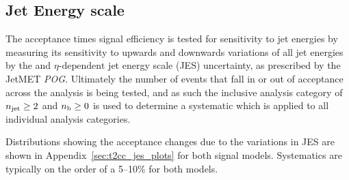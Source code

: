 





\subsection{Jet Energy scale}

The acceptance times signal efficiency is tested for sensitivity to jet energies by measuring
its sensitivity to upwards and downwards variations of all jet energies by the 
\Pt and $\eta\text{-dependent}$ jet energy scale (JES) uncertainty, as prescribed by 
the JetMET \emph{POG}.
Ultimately the number of events that fall in or out of acceptance across the analysis is
being tested, and as such the
inclusive analysis category of $n_{\text{jet}} \geq 2$ and $n_{\text{b}} \geq 0$ is used to determine
a systematic which is applied to all individual analysis categories.

Distributions showing the acceptance changes due to the variations in JES are 
shown in Appendix~\ref{sec:t2cc_jes_plots} for both signal models. Systematics
are typically on the order of a 5--10\% for both models.


